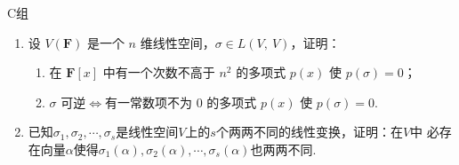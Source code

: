 \centerline{\heiti C组}
\begin{enumerate}
    \item 设 $V(\mathbf{F})$ 是一个 $n$ 维线性空间，$\sigma \in L(V,\ V)$，证明：
    \begin{enumerate}[label=(\arabic*)]
        \item 在 $\mathbf{F}[x]$ 中有一个次数不高于 $n^2$ 的多项式 $p(x)$ 使 $p(\sigma)=0$；
        \item $\sigma$ 可逆$\iff$有一常数项不为 $0$ 的多项式 $p(x)$ 使 $p(\sigma)=0$.
    \end{enumerate}
    \item 已知$\sigma_1,\sigma_2,\cdots,\sigma_s$是线性空间$V$上的$s$个两两不同的线性变换，证明：在$V$中
	必存在向量$\alpha$使得$\sigma_1(\alpha),\sigma_2(\alpha),\cdots,\sigma_s(\alpha)$也两两不同.
\end{enumerate}
